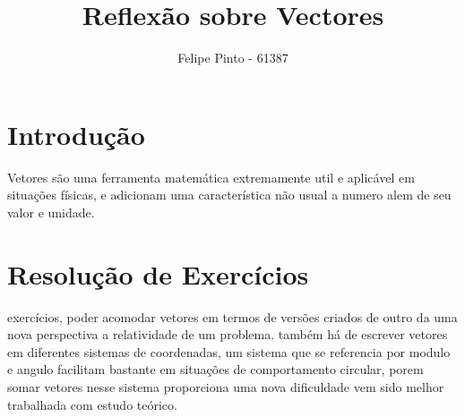 \documentclass[12pt]{article}
\begin{document}
\title{Reflexão sobre Vectores}
\author{Felipe Pinto - 61387}

\maketitle
\tableofcontents
\break


\section{Introdução}
\quad Vetores são uma ferramenta matemática extremamente util e aplicável em situações físicas, e adicionam uma característica não usual a numero alem de seu valor e unidade.

\section{Resolução de Exercícios }
 exercícios, poder acomodar vetores em termos de versões criados de outro da uma nova perspectiva a relatividade de um problema. também há de escrever vetores em diferentes sistemas de coordenadas, um sistema que se referencia por modulo e angulo facilitam bastante em situações de comportamento circular, porem somar vetores nesse sistema proporciona uma nova dificuldade vem sido melhor trabalhada com estudo teórico.
\end{document}
